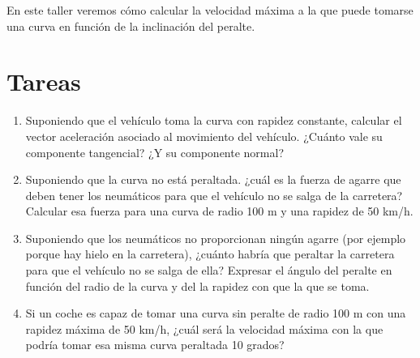 \documentclass[
  a4paper,
]{scrreport}
\begin{document}
En este taller veremos cómo calcular la velocidad máxima a la que puede
tomarse una curva en función de la inclinación del peralte.

\hypertarget{tareas}{%
\section{Tareas}\label{tareas}}

\begin{enumerate}
\def\labelenumi{\arabic{enumi}.}
\item
  Suponiendo que el vehículo toma la curva con rapidez constante,
  calcular el vector aceleración asociado al movimiento del vehículo.
  ¿Cuánto vale su componente tangencial? ¿Y su componente normal?
\item
  Suponiendo que la curva no está peraltada. ¿cuál es la fuerza de
  agarre que deben tener los neumáticos para que el vehículo no se salga
  de la carretera? Calcular esa fuerza para una curva de radio 100 m y
  una rapidez de 50 km/h.
\item
  Suponiendo que los neumáticos no proporcionan ningún agarre (por
  ejemplo porque hay hielo en la carretera), ¿cuánto habría que peraltar
  la carretera para que el vehículo no se salga de ella? Expresar el
  ángulo del peralte en función del radio de la curva y del la rapidez
  con que la que se toma.
\item
  Si un coche es capaz de tomar una curva sin peralte de radio 100 m con
  una rapidez máxima de 50 km/h, ¿cuál será la velocidad máxima con la
  que podría tomar esa misma curva peraltada 10 grados?
\end{enumerate}
\end{document}
